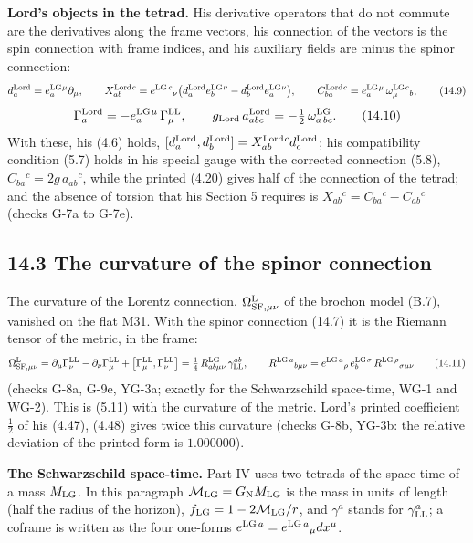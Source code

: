 \documentclass[
  10pt,
]{article}
\begin{document}
\textbf{Lord's objects in the tetrad.} His derivative operators that do
not commute are the derivatives along the frame vectors, his connection
of the vectors is the spin connection with frame indices, and his
auxiliary fields are minus the spinor connection:
\[d^{\rm Lord}_a=e^{\rm LG}_a{}^\mu\partial_\mu,\qquad X^{\rm Lord}_{ab}{}^c=e^{{\rm LG}\,c}{}_\nu\big(d^{\rm Lord}_ae^{\rm LG}_b{}^\nu-d^{\rm Lord}_be^{\rm LG}_a{}^\nu\big),\qquad C^{\rm Lord}_{ba}{}^c=e^{\rm LG}_a{}^\mu\,\omega^{\rm LG}_\mu{}^c{}_b,\tag{14.9}\]
\[\Gamma^{\rm Lord}_a=-e^{\rm LG}_a{}^\mu\,\Gamma^{\rm LL}_\mu,\qquad g_{\rm Lord}\,a^{\rm Lord}_{abc}=-\tfrac12\,\omega^{\rm LG}_{a\,bc}.\tag{14.10}\]
With these, his (4.6) holds,
\([d^{\rm Lord}_a,d^{\rm Lord}_b]=X^{\rm Lord}_{ab}{}^cd^{\rm Lord}_c\);
his compatibility condition (5.7) holds in his special gauge with the
corrected connection (5.8), \(C_{ba}{}^c=2g\,a_{ab}{}^c\), while the
printed (4.20) gives half of the connection of the tetrad; and the
absence of torsion that his Section 5 requires is
\(X_{ab}{}^c=C_{ba}{}^c-C_{ab}{}^c\) (checks G-7a to G-7e).

\hypertarget{the-curvature-of-the-spinor-connection}{%
\subsection{14.3 The curvature of the spinor
connection}\label{the-curvature-of-the-spinor-connection}}

The curvature of the Lorentz connection,
\(\Omega^{\rm L}_{{\rm SF},\mu\nu}\) of the brochon model (B.7),
vanished on the flat M31. With the spinor connection (14.7) it is the
Riemann tensor of the metric, in the frame:
\[\Omega^{\rm L}_{{\rm SF},\mu\nu}=\partial_\mu\Gamma^{\rm LL}_\nu-\partial_\nu\Gamma^{\rm LL}_\mu+\big[\Gamma^{\rm LL}_\mu,\Gamma^{\rm LL}_\nu\big]=\tfrac14\,R^{\rm LG}_{ab\mu\nu}\,\gamma^{ab}_{\rm LL},\qquad R^{{\rm LG}\,a}{}_{b\mu\nu}=e^{{\rm LG}\,a}{}_\rho\,e^{\rm LG}_b{}^\sigma\,R^{{\rm LG}\,\rho}{}_{\sigma\mu\nu}\tag{14.11}\]
(checks G-8a, G-9e, YG-3a; exactly for the Schwarzschild space-time,
WG-1 and WG-2). This is (5.11) with the curvature of the metric. Lord's
printed coefficient \(\tfrac12\) of his (4.47), (4.48) gives twice this
curvature (checks G-8b, YG-3b: the relative deviation of the printed
form is \(1.000000\)).

\textbf{The Schwarzschild space-time.} Part IV uses two tetrads of the
space-time of a mass \(M_{\rm LG}\). In this paragraph
\(\mathcal M_{\rm LG}=G_{\rm N}M_{\rm LG}\) is the mass in units of
length (half the radius of the horizon),
\(f_{\rm LG}=1-2\mathcal M_{\rm LG}/r\), and \(\gamma^a\) stands for
\(\gamma^a_{\rm LL}\); a coframe is written as the four one-forms
\(e^{{\rm LG}\,a}=e^{{\rm LG}\,a}{}_\mu dx^\mu\).
\end{document}
